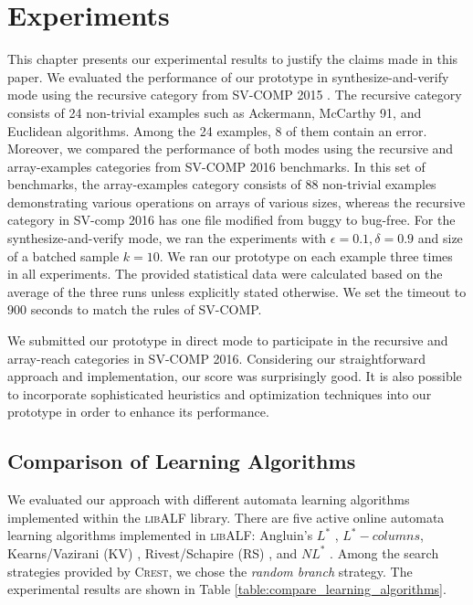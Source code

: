 \newcommand{\Mem}{\textit{Mem} }
\newcommand{\Equ}{\textit{Equ} }
\newcommand{\safe}{S}
\newcommand{\unsafe}{U}
\newcommand{\unknown}{?}
\newcommand{\exception}{E}
\newcommand{\timeout}{T.O.}
\newcommand{\unknownmark}{\ensuremath{^?}}
\newcommand{\wrongmark}{\ensuremath{^!}}

\chapter{Experiments}\label{ch:experiments}

This chapter presents our experimental results to justify the claims made in this paper. We evaluated the performance of our prototype in synthesize-and-verify mode using the recursive category from SV-COMP 2015 \cite{svcomp15} \cite{svcomp-benchmarks}. The recursive category consists of 24 non-trivial examples such as Ackermann, McCarthy 91, and Euclidean algorithms. Among the 24 examples, 8 of them contain an error. Moreover, we compared the performance of both modes using the recursive and array-examples categories from SV-COMP 2016 \cite{svcomp16} benchmarks. In this set of benchmarks, the array-examples category consists of 88 non-trivial examples demonstrating various operations on arrays of various sizes, whereas the recursive category in SV-comp 2016 has one file modified from buggy to bug-free. For the synthesize-and-verify mode, we ran the experiments with $\epsilon = 0.1, \delta = 0.9$ and size of a batched sample $k = 10$. We ran our prototype on each example three times in all experiments. The provided statistical data were calculated based on the average of the three runs unless explicitly stated otherwise. We set the timeout to 900 seconds to match the rules of SV-COMP.  

We submitted our prototype in direct mode to participate in the recursive and array-reach categories in SV-COMP 2016. Considering our straightforward approach and implementation, our score was surprisingly good. It is also possible to incorporate sophisticated heuristics and optimization techniques into our prototype in order to enhance its performance.

\section{Comparison of Learning Algorithms}\label{sec:compare_learning_algorithms}

We evaluated our approach with different automata learning algorithms implemented within the \textsc{libALF} library. There are five active online automata learning algorithms implemented in \textsc{libALF}: Angluin's $L^\ast$ \cite{Angluin87}, $L^\ast-columns$, Kearns/Vazirani (KV) \cite{KearnsV94}, Rivest/Schapire (RS) \cite{RivestS93}, and $NL^\ast$ \cite{BolligHKL09}. Among the search strategies provided by \textsc{Crest}, we chose the \emph{random branch} strategy. The experimental results are shown in Table \ref{table:compare_learning_algorithms}.

